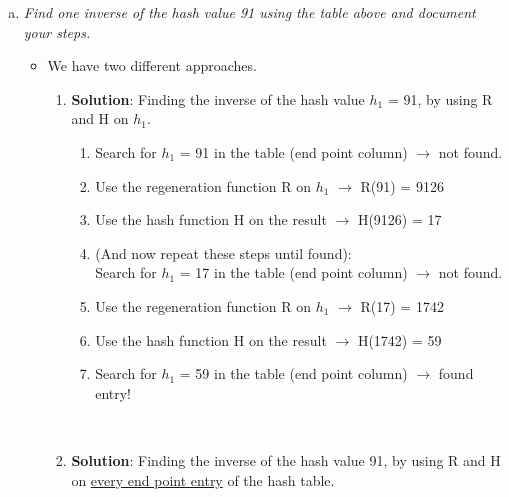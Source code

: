 \begin{enumerate}[(a)]

    \item {\itshape Find one inverse of the hash value 91 using the table above and document your steps.}
    \begin{itemize}
        \item We have two different approaches.
        \begin{enumerate}[1.]
            \item \textbf{Solution}: Finding the inverse of the hash value $h_1$ = 91, by using R and H on \underline{$h_1$}. 
                \begin{enumerate}[{1}.1]
                    \item Search for $h_1$ = 91 in the table (end point column) $\rightarrow$ not found.
                    \item Use the regeneration function R on $h_1$ $\rightarrow$ R(91) = 9126
                    \item Use the hash function H on the result $\rightarrow$ H(9126) = 17
                    \item (And now repeat these steps until found): 
                    \\ Search for $h_1$ = 17 in the table (end point column) $\rightarrow$ not found.
                    \item Use the regeneration function R on $h_1$ $\rightarrow$ R(17) = 1742
                    \item Use the hash function H on the result $\rightarrow$ H(1742) = 59
                    \item Search for $h_1$ = 59 in the table (end point column) $\rightarrow$ found entry!
                \end{enumerate}
                  
            \
            \item \textbf{Solution}: Finding the inverse of the hash value 91, by using R and H on \underline{every end point entry} of the hash table.
                \begin{enumerate}[{2}.1]
                

\end{enumerate}
\end{enumerate}
\end{itemize}
\end{enumerate}
